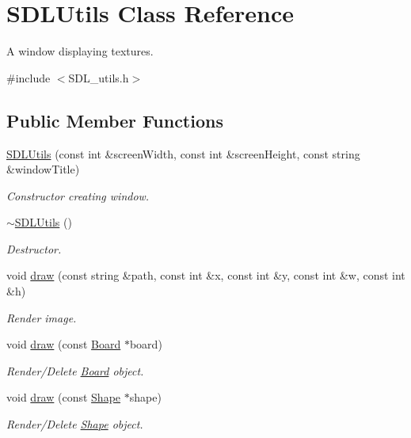 \hypertarget{class_s_d_l_utils}{}\section{S\+D\+L\+Utils Class Reference}
\label{class_s_d_l_utils}


A window displaying textures.  




{\ttfamily \#include $<$S\+D\+L\+\_\+utils.\+h$>$}

\subsection*{Public Member Functions}
\begin{DoxyCompactItemize}
\item 
\mbox{\hyperlink{class_s_d_l_utils_ae5a15651612c48ffc4965fb3173b322d}{S\+D\+L\+Utils}} (const int \&screen\+Width, const int \&screen\+Height, const string \&window\+Title)
\begin{DoxyCompactList}\small\item\em Constructor creating window. \end{DoxyCompactList}\item 
\mbox{\hyperlink{class_s_d_l_utils_a4530f05f7fdf2495a63ff1e9fc553680}{$\sim$\+S\+D\+L\+Utils}} ()
\begin{DoxyCompactList}\small\item\em Destructor. \end{DoxyCompactList}\item 
void \mbox{\hyperlink{class_s_d_l_utils_ae7645c69b8b5104833729bec7f44163b}{draw}} (const string \&path, const int \&x, const int \&y, const int \&w, const int \&h)
\begin{DoxyCompactList}\small\item\em Render image. \end{DoxyCompactList}\item 
void \mbox{\hyperlink{class_s_d_l_utils_a7b92fdc75a680aea20f240d4a98f44fb}{draw}} (const \mbox{\hyperlink{class_board}{Board}} $\ast$board)
\begin{DoxyCompactList}\small\item\em Render/\+Delete \mbox{\hyperlink{class_board}{Board}} object. \end{DoxyCompactList}\item 
void \mbox{\hyperlink{class_s_d_l_utils_adcc5697aa0fa642fe3e4fa148f23ebb4}{draw}} (const \mbox{\hyperlink{class_shape}{Shape}} $\ast$shape)
\begin{DoxyCompactList}\small\item\em Render/\+Delete \mbox{\hyperlink{class_shape}{Shape}} object. \end{DoxyCompactList}\item 

\end{DoxyCompactItemize}

